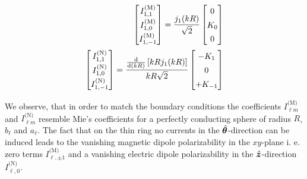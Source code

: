 \begin{align}
\left[
\renewcommand\arraystretch{1.4}\begin{matrix}
I_{1,1}^\text{(M)} \\
I_{1,0}^\text{(M)} \\ 
I_{1,-1}^\text{(M)}
\end{matrix} \right]=
\frac{j_1(kR)}{\sqrt{2}} \left[ 
\renewcommand\arraystretch{1.4}\begin{matrix}
0 \\ K_0 \\ 0
\end{matrix}
\right]
\\
\left[
\renewcommand\arraystretch{1.4}\begin{matrix}
I_{1,1}^\text{(N)} \\
I_{1,0}^\text{(N)} \\ 
I_{1,-1}^\text{(N)}
\end{matrix} \right] =  \frac{\frac{\rd}{\rd (kR)}\left[kR j_1(kR)\right]}{kR\sqrt{2}} 
\left[
\renewcommand\arraystretch{1.4}\begin{matrix}
-K_1\\0\\+K_{-1}
\end{matrix}
\right]
\end{align}

We observe, that in order to match the boundary conditions the coefficients $I_{\ell m}^\text{(M)}$ and $I_{\ell m}^\text{(N)}$ resemble Mie's coefficients for a perfectly conducting sphere of radius $R$, $b_\ell$ and $a_\ell$. 
The fact that on the thin ring no currents in the $\hat{\bm{\theta}}$-direction can be induced leads to the vanishing magnetic dipole polarizability in the $xy$-plane i. e. zero terms $I_{\ell, \pm 1}^\text{(M)}$ and a vanishing electric dipole polarizability in the $\hat{\bm{z}}$-direction $I_{\ell, 0}^\text{(N)}$.

